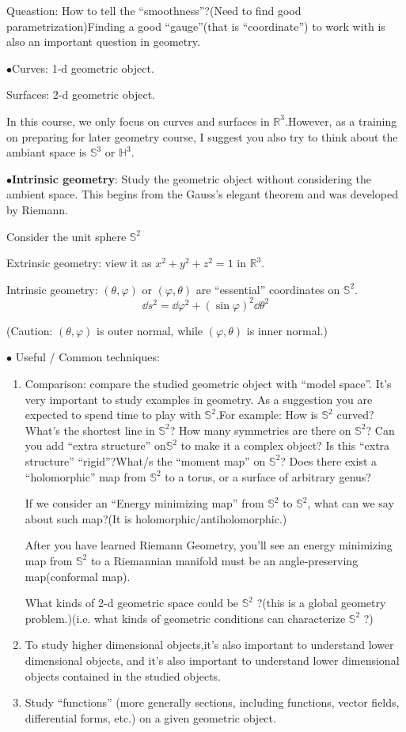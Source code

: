 Queastion: How to tell the ``smoothness''?(Need to find good parametrization)Finding a good ``gauge''(that is ``coordinate'') to work with is also an important question in geometry.

$\bullet$Curves: 1-d geometric object.

Surfaces: 2-d geometric object.
\begin{remark}
    In this course, we only focus on curves and surfaces in $\mathbb{R}^3$.However, as a training on preparing for later geometry course, I suggest you also try to think about the ambiant space is $\mathbb{S}^3$ or $\mathbb{H}^3$.

\end{remark}
$\bullet$\textbf{Intrinsic geometry}: Study the geometric object without considering the ambient space. This begins from the Gauss's elegant theorem and was developed by Riemann.
\begin{exam}
    Consider the unit sphere $\mathbb{S}^2$

    Extrinsic geometry: view it as $x^2+y^2+z^2=1$ in $\mathbb{R}^3$.

    Intrinsic geometry: $(\theta,\varphi)$ or $(\varphi,\theta)$ are ``essential'' coordinates on $\mathbb{S}^2$. \[
        \dd s^2=\dd \varphi^2+(\sin\varphi)^2 \dd\theta^2
    \]

    (Caution: $(\theta,\varphi)$ is outer normal, while $(\varphi,\theta)$ is inner normal.)
\end{exam}
$\bullet$ Useful / Common techniques:
\begin{enumerate}[1)]
    \item Comparison: compare the studied geometric object with ``model space''. It's very important to study examples in geometry. As a suggestion you are expected to spend time to play with $\mathbb{S}^2$.For example: How is $\mathbb{S}^2$ curved? What's the shortest line in $\mathbb{S}^2$? How many symmetries are there on $\mathbb{S}^2$? Can you add ``extra structure'' on$\mathbb{S}^2$ to make it a complex object? Is this ``extra structure'' ``rigid''?What/s the ``moment map'' on $\mathbb{S}^2$? Does there exist a ``holomorphic'' map from $\mathbb{S}^2$ to a torus, or a surface of arbitrary genus? 
 
    If we consider an ``Energy minimizing map'' from $\mathbb{S}^2$ to $\mathbb{S}^2$, what can we say about such map?(It is  holomorphic/antiholomorphic.)
 
    After you have learned Riemann Geometry, you'll see an energy minimizing map from $\mathbb{S}^2$ to a Riemannian manifold must be an angle-preserving map(conformal map).
 
    What kinds of 2-d geometric space could be $\mathbb{S}^2$ ?(this is a global geometry problem.)(i.e. what kinds of geometric conditions can characterize $\mathbb{S}^2$ ?)
    \item To study higher dimensional objects,it's also important to understand lower dimensional objects, and it's also important to understand lower dimensional objects contained in the studied objects.
    \item Study ``functions'' (more generally sections, including functions, vector fields, differential forms, etc.) on a given geometric object.
\end{enumerate}
